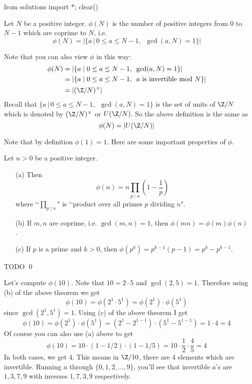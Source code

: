 \begin{python0}
from solutions import *; clear()
\end{python0}

\begin{defn}
Let $N$ be a positive integer. $\phi(N)$ is the number of positive
integers from $0$ to $N-1$ which are coprime to $N$, i.e.
\[
\phi(N) = | \{ a \,|\, 0 \leq a \leq N - 1, \,\,\,\gcd(a,N) = 1\} |
\]
\end{defn}

Note that you can also view $\phi$ in this way:
\begin{align*}
\phi(N) 
&= | \{ a \mid 0 \leq a \leq N - 1, \,\,\,\gcd(a,N) = 1\} | \\
&= | \{ a \mid 0 \leq a \leq N - 1, \,\,\, a \text{ is invertible mod } N\}|\\
&= | (\Z/N)^\times |
\end{align*}
Recall that
$\{ a \,|\, 0 \leq a \leq N - 1, \,\,\,\gcd(a,N) = 1\}$
is the set of units of $\Z/N$ which is denoted by $(\Z/N)^\times$ or $U(\Z/N)$.
So the above definition is the same as
\[
\phi(N) = | U(\Z/N) |
\]

Note that by definition $\phi(1) = 1$.
Here are some important properties of $\phi$.

\begin{prop} Let $n > 0$ be a positive integer.
  \begin{enumerate}[topsep=0in, nosep]
  \item[\textnormal{(a)}]
    Then
    \[
    \phi(n) = n \prod_{p \mid n} \left( 1 -  \frac{1}{p} \right)
    \]
    where \lq\lq $\prod_{p \mid n}$"
    is
    \lq\lq product over all primes $p$ dividing $n$".
  \item[\textnormal{(b)}] If $m,n$ are coprime, i.e. $\gcd(m,n)=1$, then
    $\phi(mn) = \phi(m)\phi(n)$.
  \item[\textnormal{(c)}]
    If $p$ is a prime and $k > 0$, then
    $\phi(p^k) = p^{k-1}(p-1) = p^k - p^{k-1}$.
  \end{enumerate}
\end{prop}
\proof
TODO
\qed

Let's compute $\phi(10)$.
Note that $10 = 2 \cdot 5$ and $\gcd(2,5) = 1$.
Therefore using (b) of the above theorem we get
\[
\phi(10) = \phi(2^1 \cdot 5^1) = \phi(2^1) \cdot \phi(5^1)
\]
since $\gcd(2^1, 5^1) = 1$.
Using (c) of the above theorem I get
\[
\phi(10) = \phi(2^1) \cdot \phi(5^1)
= (2^1 - 2^{1-1}) \cdot (5^1 - 5^{1-1}) = 1 \cdot 4 = 4
\]
Of course you can also use (a) above to get
\[
\phi(10) = 10 \cdot (1 - 1/2) \cdot (1 - 1/5)
= 10 \cdot \frac{1}{2} \cdot \frac{4}{5} = 4
\]
In both cases, we get 4.
This means in $\Z/10$, there are 4 elements which are invertible.
Running $a$ through $\{0, 1, 2, ..., 9\}$,
you'll see that invertible $a$'s are $1, 3, 7, 9$
with inverses $1, 7, 3, 9$ respectively.

